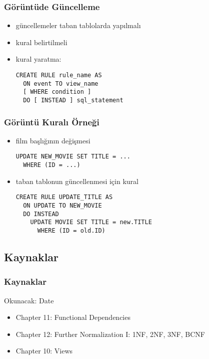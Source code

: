 \documentclass[dvipsnames]{beamer}
\theoremstyle{theorem}
\begin{document}
\begin{frame}[fragile]
  \frametitle{Görüntüde Güncelleme}

  \begin{itemize}
    \item güncellemeler taban tablolarda yapılmalı
    \item kural belirtilmeli

    \pause
    \bigskip
    \item kural yaratma:
    \begin{lstlisting}
CREATE RULE rule_name AS
  ON event TO view_name
  [ WHERE condition ]
  DO [ INSTEAD ] sql_statement
    \end{lstlisting}
  \end{itemize}
\end{frame}

\begin{frame}[fragile]
  \frametitle{Görüntü Kuralı Örneği}

  \begin{itemize}
    \item film başlığının değişmesi 
    \begin{lstlisting}
UPDATE NEW_MOVIE SET TITLE = ...
  WHERE (ID = ...)
    \end{lstlisting}

    \pause
    \medskip
    \item taban tablonun güncellenmesi için kural
    \begin{lstlisting}
CREATE RULE UPDATE_TITLE AS
  ON UPDATE TO NEW_MOVIE
  DO INSTEAD
    UPDATE MOVIE SET TITLE = new.TITLE
      WHERE (ID = old.ID)
    \end{lstlisting}
  \end{itemize}
\end{frame}

\subsection*{Kaynaklar}

\begin{frame}
  \frametitle{Kaynaklar}

  \begin{block}{Okunacak: Date}
    \begin{itemize}
      \item Chapter 11: \alert{Functional Dependencies}
      \item Chapter 12: \alert{Further Normalization I: 1NF, 2NF, 3NF, BCNF}
       \item Chapter 10: \alert{Views}
    \end{itemize}
  \end{block}
\end{frame}
\end{document}
